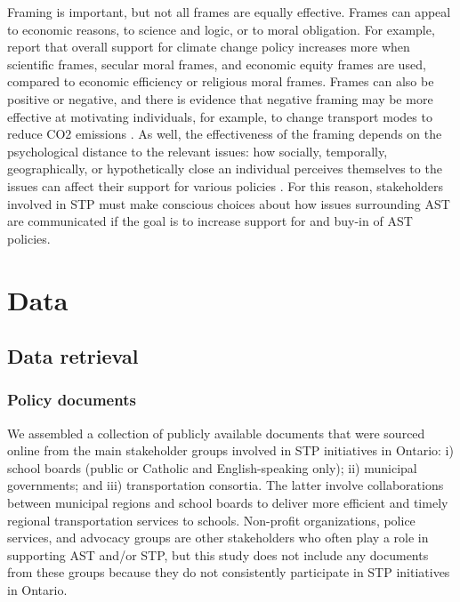 \documentclass[preprint, 3p,
authoryear]{elsarticle} %
\begin{document}
Framing is important, but not all frames are equally effective. Frames
can appeal to economic reasons, to science and logic, or to moral
obligation. For example, \citet{severson2015moral} report that overall
support for climate change policy increases more when scientific frames,
secular moral frames, and economic equity frames are used, compared to
economic efficiency or religious moral frames. Frames can also be
positive or negative, and there is evidence that negative framing may be
more effective at motivating individuals, for example, to change
transport modes to reduce CO2 emissions
\citep{waygoodCO2ValenceFraming2018}. As well, the effectiveness of the
framing depends on the psychological distance to the relevant issues:
how socially, temporally, geographically, or hypothetically close an
individual perceives themselves to the issues can affect their support
for various policies \citep{maiella2020psychological}. For this reason,
stakeholders involved in STP must make conscious choices about how
issues surrounding AST are communicated if the goal is to increase
support for and buy-in of AST policies.

\hypertarget{data}{%
\section{Data}\label{data}}

\hypertarget{data-retrieval}{%
\subsection{Data retrieval}\label{data-retrieval}}

\hypertarget{policy-documents}{%
\subsubsection{Policy documents}\label{policy-documents}}

We assembled a collection of publicly available documents that were
sourced online from the main stakeholder groups involved in STP
initiatives in Ontario: i) school boards (public or Catholic and
English-speaking only); ii) municipal governments; and iii)
transportation consortia. The latter involve collaborations between
municipal regions and school boards to deliver more efficient and timely
regional transportation services to schools. Non-profit organizations,
police services, and advocacy groups are other stakeholders who often
play a role in supporting AST and/or STP, but this study does not
include any documents from these groups because they do not consistently
participate in STP initiatives in Ontario.
\end{document}
